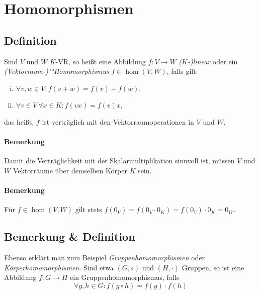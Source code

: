 \section{Homomorphismen}
\subsection{Definition}
	\begin{Definition}[Homomorphismus]
		Sind $ V $ und $ W $ $ K $-VR, so heißt eine Abbildung $f: V \rightarrow W$ \emph{($K$-)linear} oder ein \emph{(Vektorraum-)""Homomorphismus} $f\in \hom(V,W)$, falls gilt:

                \begin{enumerate}[(i)]
                        \item $\forall v,w \in V: f(v+w) = f(v) + f(w)$,
                        \item $\forall v\in V\ \forall x\in K: f(vx) = f(v)x$,
                \end{enumerate}

                das heißt, $ f $ ist verträglich mit den Vektorraumoperationen in $ V $ und $ W $.
	\end{Definition}

\paragraph{Bemerkung}
	Damit die Verträglichkeit mit der Skalarmultiplikation sinnvoll ist, müssen $ V $ und $ W $ Vektorräume über demselben Körper $ K $ sein.

\paragraph{Bemerkung}
	Für $f\in \hom(V,W)$ gilt stets $f(0_V) = f(0_V\cdot0_K) = f(0_V)\cdot0_K = 0_W$.

\subsection{Bemerkung \& Definition}
        Ebenso erklärt man zum Beispiel \emph{Gruppenhomomorphismen} oder \emph{Körperhomomorphismen}. Sind etwa $(G,\circ)$ und $(H,\cdot)$ Gruppen, so ist eine Abbildung $f: G \to H$ ein Gruppenhomomorphismus, falls
        \begin{equation*}
            \forall g,h \in G: f(g\circ h) = f(g) \cdot f(h)
        \end{equation*}
  
